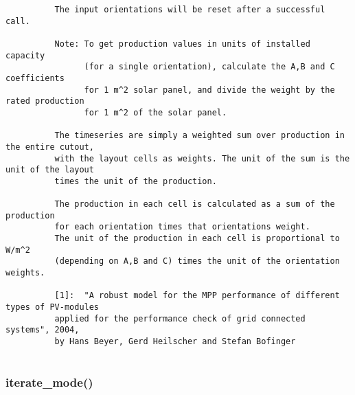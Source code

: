 \begin{verbatim}
          The input orientations will be reset after a successful call.

          Note: To get production values in units of installed capacity
                (for a single orientation), calculate the A,B and C coefficients
                for 1 m^2 solar panel, and divide the weight by the rated production
                for 1 m^2 of the solar panel.

          The timeseries are simply a weighted sum over production in the entire cutout,
          with the layout cells as weights. The unit of the sum is the unit of the layout
          times the unit of the production.

          The production in each cell is calculated as a sum of the production
          for each orientation times that orientations weight.
          The unit of the production in each cell is proportional to W/m^2
          (depending on A,B and C) times the unit of the orientation weights.

          [1]:  "A robust model for the MPP performance of different types of PV-modules
          applied for the performance check of grid connected systems", 2004,
          by Hans Beyer, Gerd Heilscher and Stefan Bofinger
          
\end{verbatim}
\subsubsection{iterate\_mode()}


